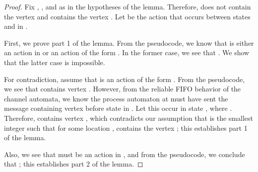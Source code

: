 \documentclass[11pt]{article}
\numberwithin{theorem}{section}
\begin{document}
\begin{proof}
Fix , , and  as in the hypotheses of the lemma. Therefore,
 does not contain the vertex  and
 contains the vertex . Let  be the action
that occurs between states  and  in
.

First, we prove part 1 of the lemma.
From the pseudocode, we know that  is either an action in 
or an action of the form . In the former case, we
see that . We show that the latter case is impossible.

For contradiction, assume that  is an action of the form
. From the pseudocode, we see that 
contains vertex . However, from the reliable FIFO behavior of
the channel automata, we know the process automaton at  must have
sent the message  containing vertex  before state
 in . Let this occur in state ,
where . Therefore,  contains vertex
, which contradicts our assumption that  is the smallest
integer such that for some location ,  contains
the vertex ; this establishes part 1 of the lemma. 

Also, we see 
that  must be an action in , and from the pseudocode,
we conclude that ; this establishes part 2 of the lemma.
\end{proof}
\end{document}
